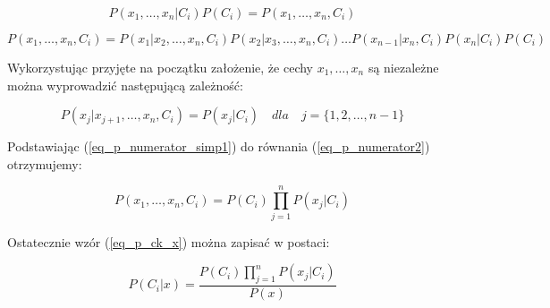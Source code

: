 	\begin{equation}
	\label{eq_p_numerator1}
		P(x_1, \dots , x_n | C_i)P(C_i) = P(x_1, \dots, x_n, C_i)
	\end{equation}

	\begin{equation}
	\label{eq_p_numerator2}
		P(x_1, \dots, x_n, C_i) = P(x_1 | x_2 , \dots , x_n, C_i)P(x_2 | x_3, \dots , x_n, 	C_i) \dots P(x_{n-1} | x_n, C_i)P(x_n | C_i)P(C_i)
	\end{equation}
	
Wykorzystując przyjęte na początku założenie, że cechy ${x_1, \dots, x_n}$ są niezależne można wyprowadzić następującą zależność:

	\begin{equation}
	\label{eq_p_numerator_simp1}
		P(x_j | x_{j+1}, \dots , x_n, C_i) = P(x_j | C_i) \quad dla \quad j = \{1, 2, \dots, n-1\}
	\end{equation}

Podstawiając (\ref{eq_p_numerator_simp1}) do równania (\ref{eq_p_numerator2}) otrzymujemy:
	
	\begin{equation}
	\label{eq_p_numerator_simp2}
		P(x_1, \dots, x_n, C_i) = P(C_i) \prod_{j = 1}^n P(x_j | C_i)
	\end{equation}

Ostatecznie wzór (\ref{eq_p_ck_x}) można zapisać w postaci:

	\begin{equation}
	\label{eq_p_ck_x_simp}
		P(C_i | x) = \frac{P(C_i) \prod_{j = 1}^n P(x_j | C_i)}{P(x)}
	\end{equation}



